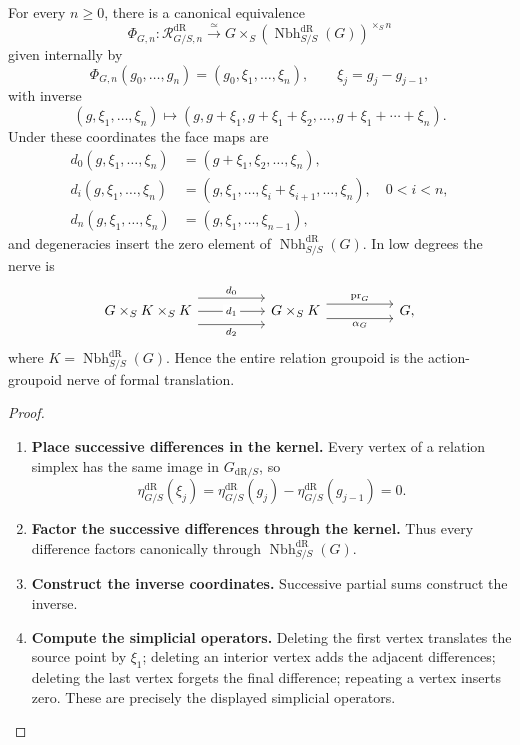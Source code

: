 \begin{theorem}
\label{thm:formal-translation-nerve-explicit}
For every \(n\geq0\), there is a canonical equivalence
\[
  \Phi_{G,n}:
  \mathcal R^{\mathrm{dR}}_{G/S,n}\xrightarrow{\simeq}G\times_S(\operatorname{Nbh}^{\mathrm{dR}}_{S/S}(G))^{\times_S n}
\]
given internally by
\[
  \Phi_{G,n}(g_0,\ldots,g_n)
  =
  (g_0,\xi_1,\ldots,\xi_n),
  \qquad
  \xi_j=g_j-g_{j-1},
\]
with inverse
\[
  (g,\xi_1,\ldots,\xi_n)
  \longmapsto
  (g,g+\xi_1,g+\xi_1+\xi_2,\ldots,g+\xi_1+\cdots+\xi_n).
\]
Under these coordinates the face maps are
\[
\begin{aligned}
  d_0(g,\xi_1,\ldots,\xi_n)
  &=(g+\xi_1,\xi_2,\ldots,\xi_n),\\
  d_i(g,\xi_1,\ldots,\xi_n)
  &=(g,\xi_1,\ldots,\xi_i+\xi_{i+1},\ldots,\xi_n),
    \quad 0<i<n,\\
  d_n(g,\xi_1,\ldots,\xi_n)
  &=(g,\xi_1,\ldots,\xi_{n-1}),
\end{aligned}
\]
and degeneracies insert the zero element of
\(\operatorname{Nbh}^{\mathrm{dR}}_{S/S}(G)\). In low degrees the nerve is
\[
\begin{tikzcd}[column sep=huge]
G\times_S K\times_S K
  \ar[r,shift left=2.2ex,"d_0"]
  \ar[r,"d_1" description]
  \ar[r,shift right=2.2ex,"d_2"']
&
G\times_S K
  \ar[r,shift left=1.2ex,"\operatorname{pr}_G"]
  \ar[r,shift right=1.2ex,"\alpha_G"']
&
G ,
\end{tikzcd}
\]
where \(K=\operatorname{Nbh}^{\mathrm{dR}}_{S/S}(G)\). Hence the entire
relation groupoid is the action-groupoid nerve of formal translation.
\end{theorem}

\begin{proof}
\leavevmode
\begin{enumerate}[label=\textup{(\arabic*)}]
    \item \textbf{Place successive differences in the kernel.}
Every vertex of a relation simplex has the same image in
\(G_{\mathrm{dR}/S}\), so
\[
  \eta_{G/S}^{\mathrm{dR}}(\xi_j)
  =
  \eta_{G/S}^{\mathrm{dR}}(g_j)-\eta_{G/S}^{\mathrm{dR}}(g_{j-1})
  =0.
\]

    \item \textbf{Factor the successive differences through the kernel.}
Thus every difference factors canonically through \(\operatorname{Nbh}^{\mathrm{dR}}_{S/S}(G)\).

    \item \textbf{Construct the inverse coordinates.}
Successive partial
sums construct the inverse.

    \item \textbf{Compute the simplicial operators.}
Deleting the first vertex translates the source point by
\(\xi_1\); deleting an interior vertex adds the adjacent differences; deleting
the last vertex forgets the final difference; repeating a vertex inserts zero.
These are precisely the displayed simplicial operators.
\end{enumerate}
\end{proof}


